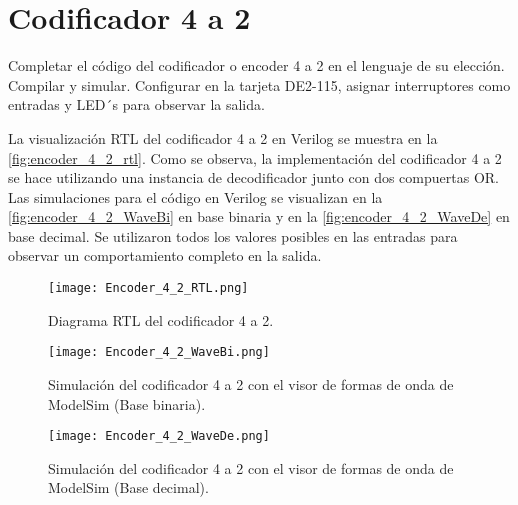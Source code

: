 \section{Codificador 4 a 2 \label{sec:s4}}

\begin{center}
	\begin{minipage}{12cm}
		\begin{tcolorbox}[title=Actividad 4]
			Completar el código del codificador o encoder 4 a 2 en el lenguaje de su elección. Compilar y simular. Configurar en la tarjeta DE2-115, asignar interruptores como entradas y LED´s para observar la salida.
		\end{tcolorbox}	
	\end{minipage}
\end{center}

La visualización RTL del codificador 4 a 2 en Verilog se muestra en la \autoref{fig:encoder_4_2_rtl}. Como se observa, la implementación del codificador 4 a 2 se hace utilizando una instancia de decodificador junto con dos compuertas OR. Las simulaciones para el código en Verilog se visualizan en la \autoref{fig:encoder_4_2_WaveBi} en base binaria y en la \autoref{fig:encoder_4_2_WaveDe} en base decimal. Se utilizaron todos los valores posibles en las entradas para observar un comportamiento completo en la salida.

\begin{figure}[ht]
	\centering
	\texttt{[image: Encoder\_4\_2\_RTL.png]}
	\caption{Diagrama RTL del codificador 4 a 2. \label{fig:encoder_4_2_rtl}}
\end{figure}

\begin{figure}[ht]
	\centering
	\texttt{[image: Encoder\_4\_2\_WaveBi.png]}
	\caption{Simulación del codificador 4 a 2 con el visor de formas de onda de ModelSim (Base binaria). \label{fig:encoder_4_2_WaveBi}}
\end{figure}

\begin{figure}[ht]
	\centering
	\texttt{[image: Encoder\_4\_2\_WaveDe.png]}
	\caption{Simulación del codificador 4 a 2 con el visor de formas de onda de ModelSim (Base decimal). \label{fig:encoder_4_2_WaveDe}}
\end{figure}